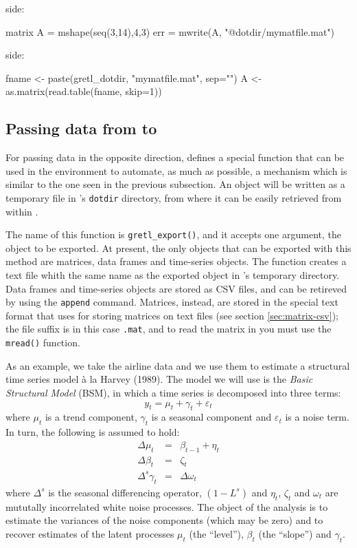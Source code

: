  side:
\begin{code}
  matrix A = mshape(seq(3,14),4,3)
  err = mwrite(A, "@dotdir/mymatfile.mat")
\end{code}
 side:
\begin{code}
  fname <- paste(gretl_dotdir, "mymatfile.mat", sep="")
  A <- as.matrix(read.table(fname, skip=1))
\end{code}

\subsection{Passing data from  to }

For passing data in the opposite direction,  defines a
special function that can be used in the  environment to
automate, as much as possible, a mechanism which is similar to the one
seen in the previous subsection. An  object will be written as
a temporary file in 's \texttt{dotdir} directory, from
where it can be easily retrieved from within .

The name of this function is \texttt{gretl\_export()}, and it accepts
one argument, the object to be exported. At present, the only objects
that can be exported with this method are matrices, data frames and
time-series objects. The function creates a text file whith the same
name as the exported object in 's temporary directory. Data
frames and time-series objects are stored as CSV files, and can be
retireved by using the \texttt{append} command. Matrices, instead, are
stored in the special text format that  uses for storing
matrices on text files (see section \ref{sec:matrix-csv}); the file
suffix is in this case \texttt{.mat}, and to read the matrix in
 you must use the \texttt{mread()} function.

As an example, we take the airline data and we use them to estimate a
structural time series model \`a la Harvey (1989). The model we will 
use is the \emph{Basic Structural Model} (BSM), in which a time series
is decomposed into three terms:
\[
  y_t = \mu_t + \gamma_t + \varepsilon_t
\]
where $\mu_t$ is a trend component, $\gamma_t$ is a seasonal component
and $\varepsilon_t$ is a noise term. In turn, the following is assumed
to hold:
\begin{eqnarray*}
  \Delta \mu_t & = & \beta_{t-1} + \eta_t \\
  \Delta \beta_t & = & \zeta_t \\
  \Delta^s \gamma_t & = & \Delta \omega_t
\end{eqnarray*}
where $\Delta^s$ is the seasonal differencing operator, $(1-L^s)$ and
$\eta_t$, $\zeta_t$ and $\omega_t$ are mututally incorrelated white
noise processes. The object of the analysis is to estimate the
variances of the noise components (which may be zero) and to recover
estimates of the latent processes $\mu_t$ (the ``level''), $\beta_t$
(the ``slope'') and $\gamma_t$.

